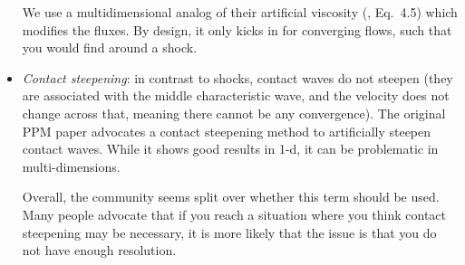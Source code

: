 \begin{itemize}
  We use a multidimensional analog of their artificial viscosity
  (\cite{colellawoodward:1984}, Eq.\ 4.5) which modifies the fluxes.
  By design, it only kicks in for converging flows, such that you
  would find around a shock.

\item {\em Contact steepening}: in contrast to shocks, contact waves
  do not steepen (they are associated with the middle characteristic
  wave, and the velocity does not change across that, meaning there
  cannot be any convergence).  The original PPM
  paper advocates a contact steepening method to artificially steepen
  contact waves.  While it shows good results in 1-d, it can be
  problematic in multi-dimensions.  

  Overall, the community seems split over whether this term should be
  used.  Many people advocate that if you reach a situation where you
  think contact steepening may be necessary, it is more likely that
  the issue is that you do not have enough resolution.


\end{itemize}
